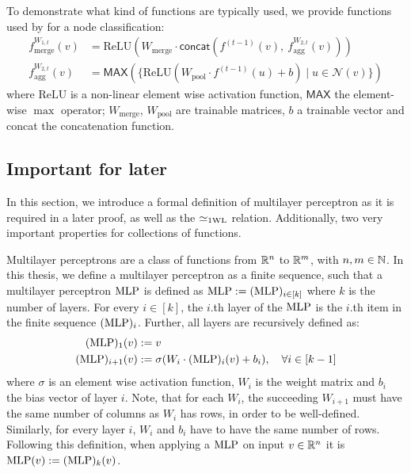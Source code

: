To demonstrate what kind of functions are typically used, we provide functions used by \cite{Ham+2017} for a node classification:
\begin{align*}
    f^{W_{1,t}}_{\text{merge}}(v) &= \text{ReLU} (W_{\text{merge}} \cdot \textsf{concat}(f^{(t-1)}(v), \ f^{W_{2,t}}_{\text{agg}}(v)))\\
    f^{W_{2,t}}_{\text{agg}}(v) &= \textsf{MAX}(\{ \text{ReLU}(W_{\text{pool}} \cdot f^{(t-1)}(u) + b) \mid u \in \mathcal{N}(v)\})
\end{align*}
where $\text{ReLU}$ is a non-linear element wise activation function, $\textsf{MAX}$ the element-wise $\max$ operator; $W_{\text{merge}}$, $W_{\text{pool}}$ are trainable matrices, $b$ a trainable vector and \textsf{concat} the concatenation function.



\subsection{Important for later}
In this section, we introduce a formal definition of multilayer perceptron as it is required in a later proof, as well as the $\simeq_{\text{1WL}}$ relation. Additionally, two very important properties for collections of functions.

\begin{definition}\label{def:mlp}
    Multilayer perceptrons are a class of functions from $\mathbb{R}^n$ to $\mathbb{R}^m$, with $n,m \in \mathbb{N}$. In this thesis, we define a multilayer perceptron as a finite sequence, such that a multilayer perceptron $\text{MLP}$ is defined as $\text{MLP} := (\text{MLP})_{i\in[k]}$ where $k$ is the number of layers. For every $i \in [k]$, the $i$.th layer of the $\text{MLP}$ is the $i$.th item in the finite sequence $(\text{MLP})_i$. Further, all layers are recursively defined as:
    \begin{align*}
        (\text{MLP})_{1}(v) &:= v\\
        (\text{MLP})_{i+1}(v) &:= \sigma(W_i \cdot (\text{MLP})_{i} (v) + b_i), \quad \forall i \in [k-1]
    \end{align*}
    where $\sigma$ is an element wise activation function, $W_i$ is the weight matrix and $b_i$ the bias vector of layer $i$. Note, that for each $W_i$, the succeeding $W_{i+1}$ must have the same number of columns as $W_i$ has rows, in order to be well-defined. Similarly, for every layer $i$, $W_i$ and $b_i$ have to have the same number of rows.
    Following this definition, when applying a $\text{MLP}$ on input $v \in \mathbb{R}^n$ it is $\text{MLP}(v) := (\text{MLP})_k(v)$.
\end{definition}

